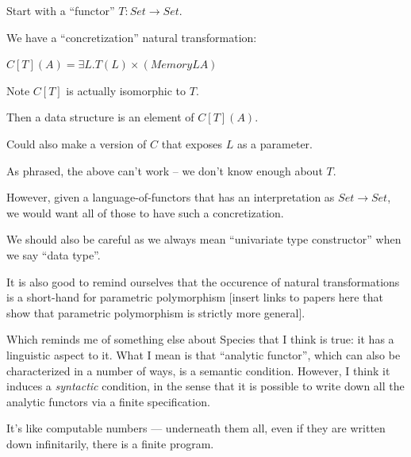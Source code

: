 \documentclass{jfp}
\begin{document}
\begin{commentary}
  Start with a ``functor'' $T : Set \to Set$.

  We have a ``concretization'' natural transformation:

  $C[T](A) = \exists L. T(L) \times (Memory L A)$

  Note $C[T]$ is actually isomorphic to $T$.

  Then a data structure is an element of $C[T](A)$.

  Could also make a version of $C$ that exposes $L$ as a parameter.
\end{commentary}

\begin{commentary}
As phrased, the above can't work -- we don't know enough about $T$.

However, given a language-of-functors that has an interpretation
as $ Set \to Set $, we would want all of those to have such a
concretization.

We should also be careful as we always mean ``univariate type
constructor'' when we say ``data type''.

It is also good to remind ourselves that the occurence of
natural transformations is a short-hand for parametric
polymorphism [insert links to papers here that show that
parametric polymorphism is strictly more general].

\end{commentary}

\begin{commentary}
Which reminds me of something else about Species that I think
is true: it has a linguistic aspect to it.  What I mean is that
``analytic functor'', which can also be characterized in a number of
ways, is a semantic condition.  However, I think it induces a \emph{syntactic}
condition, in the sense that it is possible to write down all the
analytic functors via a finite specification.

It's like computable numbers --- underneath them all, even if they
are written down infinitarily, there is a finite program.
\end{commentary}
\end{document}
